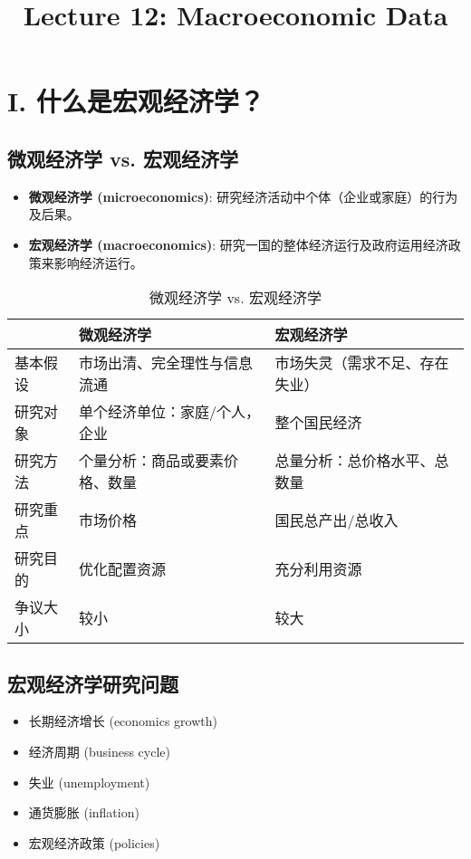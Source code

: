 \documentclass[12pt, a4paper]{article}
\title{Lecture 12: Macroeconomic Data}
\author{}
\date{}
\begin{document}
\maketitle

\section*{I. 什么是宏观经济学？}
\subsection*{微观经济学 vs. 宏观经济学}
\begin{itemize}
    \item \textbf{微观经济学 (microeconomics)}: 研究经济活动中个体（企业或家庭）的行为及后果。
    \item \textbf{宏观经济学 (macroeconomics)}: 研究一国的整体经济运行及政府运用经济政策来影响经济运行。
\end{itemize}

\begin{table}[h]
    \centering
    \begin{tabular}{|l|l|l|}
        \hline
        & \textbf{微观经济学} & \textbf{宏观经济学} \\
        \hline
        基本假设 & 市场出清、完全理性与信息流通 & 市场失灵（需求不足、存在失业） \\
        \hline
        研究对象 & 单个经济单位：家庭/个人，企业 & 整个国民经济 \\
        \hline
        研究方法 & 个量分析：商品或要素价格、数量 & 总量分析：总价格水平、总数量 \\
        \hline
        研究重点 & 市场价格 & 国民总产出/总收入 \\
        \hline
        研究目的 & 优化配置资源 & 充分利用资源 \\
        \hline
        争议大小 & 较小 & 较大 \\
        \hline
    \end{tabular}
    \caption{微观经济学 vs. 宏观经济学}
\end{table}

\subsection*{宏观经济学研究问题}
\begin{itemize}
    \item 长期经济增长 (economics growth)
    \item 经济周期 (business cycle)
    \item 失业 (unemployment)
    \item 通货膨胀 (inflation)
    \item 宏观经济政策 (policies)
\end{itemize}
\end{document}
